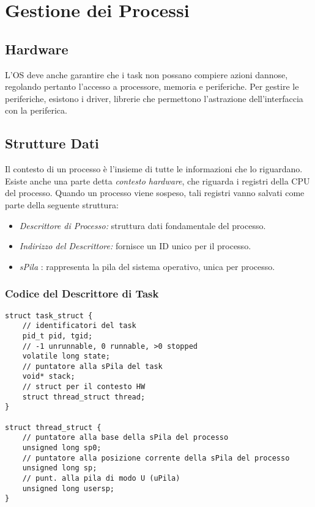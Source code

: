 \documentclass[10pt,a4paper]{article}
\begin{document}
\section{Gestione dei Processi}

\subsection{Hardware}
L'OS deve anche garantire che i task non possano compiere azioni dannose, regolando pertanto l'accesso a processore, memoria e periferiche. Per gestire le periferiche, esistono i driver, librerie che permettono l'astrazione dell'interfaccia con la periferica.

\subsection{Strutture Dati}
Il contesto di un processo è l'insieme di tutte le informazioni che lo riguardano. Esiste anche una parte detta \emph{contesto hardware}, che riguarda i registri della CPU del processo. Quando un processo viene sospeso, tali registri vanno salvati come parte della seguente struttura:
\begin{itemize}
    \item \emph{Descrittore di Processo:} struttura dati fondamentale del processo.
    \item \emph{Indirizzo del Descrittore:} fornisce un ID unico per il processo.
    \item \emph{sPila} : rappresenta la pila del sistema operativo, unica per processo.
\end{itemize}

\subsubsection{Codice del Descrittore di Task}
\begin{verbatim}
struct task_struct {
    // identificatori del task
    pid_t pid, tgid;
    // -1 unrunnable, 0 runnable, >0 stopped
    volatile long state;    
    // puntatore alla sPila del task
    void* stack;
    // struct per il contesto HW
    struct thread_struct thread; 
}

struct thread_struct {
    // puntatore alla base della sPila del processo
    unsigned long sp0;
    // puntatore alla posizione corrente della sPila del processo
    unsigned long sp;
    // punt. alla pila di modo U (uPila)
    unsigned long usersp;
}
\end{verbatim}
\end{document}
